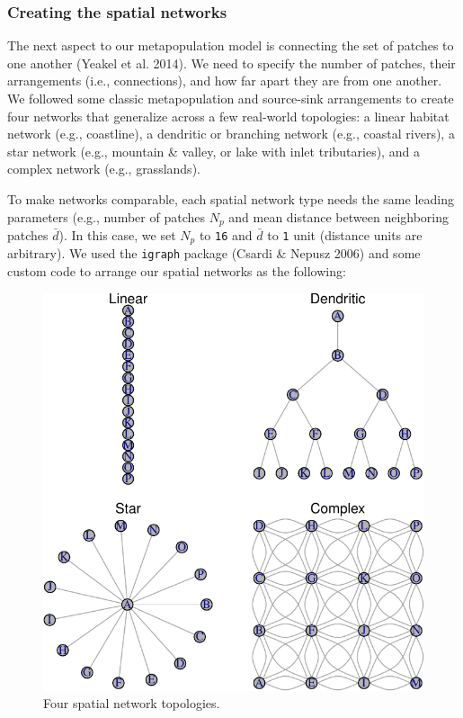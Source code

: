 \documentclass[
]{article}
\begin{document}
\hypertarget{creating-the-spatial-networks}{%
\subsubsection{Creating the spatial
networks}\label{creating-the-spatial-networks}}

The next aspect to our metapopulation model is connecting the set of
patches to one another (Yeakel et al. 2014). We need to specify the
number of patches, their arrangements (i.e., connections), and how far
apart they are from one another. We followed some classic metapopulation
and source-sink arrangements to create four networks that generalize
across a few real-world topologies: a linear habitat network (e.g.,
coastline), a dendritic or branching network (e.g., coastal rivers), a
star network (e.g., mountain \& valley, or lake with inlet tributaries),
and a complex network (e.g., grasslands).

To make networks comparable, each spatial network type needs the same
leading parameters (e.g., number of patches \(N_p\) and mean distance
between neighboring patches \(\bar{d}\)). In this case, we set \(N_p\)
to \texttt{16} and \(\bar{d}\) to \texttt{1} unit (distance units are
arbitrary). We used the \texttt{igraph} package (Csardi \& Nepusz 2006)
and some custom code to arrange our spatial networks as the following:

\begin{figure}[H]

{\centering \includegraphics{Managing_for_ecological_surprises_in_metapopulations_files/figure-latex/networks-1} 

}

\caption{Four spatial network topologies.}\label{fig:networks}
\end{figure}
\end{document}
